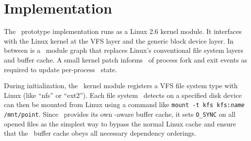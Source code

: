 \section{Implementation}
\label{sec:implementation}

The \Kudos\ prototype implementation runs as a Linux 2.6 kernel module.
%
%
It interfaces with the Linux kernel at the VFS layer and the generic block
device layer.
%
In between is a \Kudos\ module graph that replaces Linux's conventional
file system layers and buffer cache.
%
A small kernel patch informs \Kudos\ of process fork and exit events as
required to update per-process \patchgroup\ state.


During initialization, the \Kudos\ kernel module registers a VFS file system
type with Linux (like ``nfs'' or ``ext2'').
%
Each file system \Kudos\ detects on a specified disk device can then be mounted
from Linux using a command like \mbox{\texttt{mount -t kfs kfs:\textit{name}
/mnt/point}}.
%
Since \Kudos\ provides its own \patch-aware buffer cache, it sets
\texttt{O\_SYNC} on all opened files as the simplest way to bypass the normal
Linux cache and ensure that the \Kudos\ buffer cache obeys all necessary
dependency orderings.


